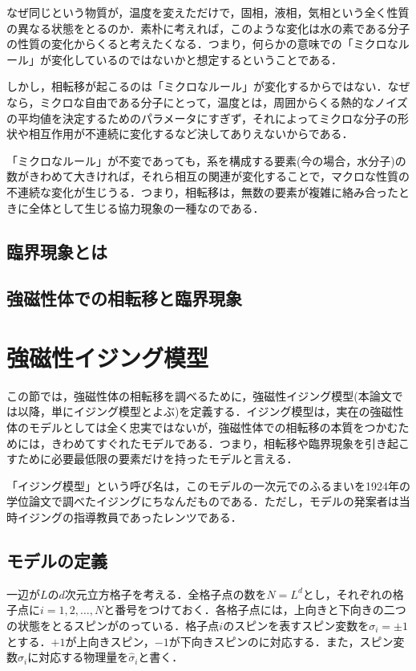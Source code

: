 \documentclass[a4paper,11pt]{jsreport}
\begin{document}
なぜ同じという物質が，温度を変えただけで，固相，液相，気相という全く性質の異なる状態をとるのか．素朴に考えれば，このような変化は水の素である分子の性質の変化からくると考えたくなる．つまり，何らかの意味での「ミクロなルール」が変化しているのではないかと想定するということである．\par
しかし，相転移が起こるのは「ミクロなルール」が変化するからではない．なぜなら，ミクロな自由である分子にとって，温度とは，周囲からくる熱的なノイズの平均値を決定するためのパラメータにすぎず，それによってミクロな分子の形状や相互作用が不連続に変化するなど決してありえないからである．\par
「ミクロなルール」が不変であっても，系を構成する要素(今の場合，水分子)の数がきわめて大きければ，それら相互の関連が変化することで，マクロな性質の不連続な変化が生じうる．つまり，相転移は，無数の要素が複雑に絡み合ったときに全体として生じる協力現象の一種なのである．

\subsection{臨界現象とは}

\subsection{強磁性体での相転移と臨界現象}


\section{強磁性イジング模型}
この節では，強磁性体の相転移を調べるために，強磁性イジング模型(本論文では以降，単にイジング模型とよぶ)を定義する．イジング模型は，実在の強磁性体のモデルとしては全く忠実ではないが，強磁性体での相転移の本質をつかむためには，きわめてすぐれたモデルである．つまり，相転移や臨界現象を引き起こすために必要最低限の要素だけを持ったモデルと言える．\par
「イジング模型」という呼び名は，このモデルの一次元でのふるまいを1924年の学位論文で調べたイジングにちなんだものである．ただし，モデルの発案者は当時イジングの指導教員であったレンツである．\par
\subsection{モデルの定義}
一辺が$L$の$d$次元立方格子を考える．全格子点の数を$N=L^d$とし，それぞれの格子点に$i=1,2,\dots ,N$と番号をつけておく．各格子点には，上向きと下向きの二つの状態をとるスピンがのっている．格子点$i$のスピンを表すスピン変数を$\sigma_i = \pm{1}$とする．$+1$が上向きスピン，$-1$が下向きスピンのに対応する．また，スピン変数$\sigma_i$に対応する物理量を$\hat{\sigma}_i$と書く．\par
\end{document}

